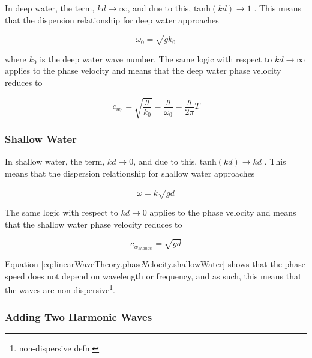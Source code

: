 In deep water, the term, $kd \to \infty$, and due to this, $\text{tanh}(kd) \to 1$ \cite{Holthuijsen2007}. This means that the dispersion relationship for deep water approaches

\begin{equation} \label{eq:linearWaveTheory.dispersionRelationship.deepWater}
    \omega_{0} = \sqrt{gk_{0}}
\end{equation}

where $k_0$ is the deep water wave number. The same logic with respect to $kd \to \infty$ applies to the phase velocity and means that the deep water phase velocity reduces to 

\begin{equation} \label{eq:linearWaveTheory.phaseVelocity.deepWater}
    c_{w_0} = \sqrt{\frac{g}{k_{0}}} = \frac{g}{\omega_{0}}  = \frac{g}{2\pi}T
\end{equation}

\subsubsection{Shallow Water} \label{subsec:theory.waves.linearWaveTheory.shallowWater}

In shallow water, the term, $kd \to 0$, and due to this, $\text{tanh}(kd) \to kd$ \cite{Holthuijsen2007}. This means that the dispersion relationship for shallow water approaches

\begin{equation} \label{eq:linearWaveTheory.dispersionRelationship.shallowWater}
    \omega = k\sqrt{gd}
\end{equation}

The same logic with respect to $kd \to 0$ applies to the phase velocity and means that the shallow water phase velocity reduces to 

\begin{equation} \label{eq:linearWaveTheory.phaseVelocity.shallowWater}
    c_{w_{shallow}} = \sqrt{gd}
\end{equation}

Equation \ref{eq:linearWaveTheory.phaseVelocity.shallowWater} shows that the phase speed does not depend on wavelength or frequency, and as such, this means that the waves are non-dispersive\footnote{non-dispersive defn.}.

\subsubsection{Adding Two Harmonic Waves} \label{subsec:theory.waves.linearWaveTheory.twoHarmonicWaves}

